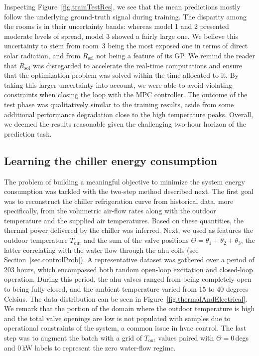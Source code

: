 Inspecting Figure~\ref{fig.trainTestRes}, we see that the mean predictions mostly follow the underlying ground-truth signal during training. The disparity among the rooms is in their uncertainty bands: whereas model 1 and 2 presented moderate levels of spread, model 3 showed a fairly large one. We believe this uncertainty to stem from room~3 being the most exposed one in terms of direct solar radiation, and from $R_\text{sol}$ not being a feature of its GP. We remind the reader that $R_\text{sol}$ was disregarded to accelerate the real-time computations and ensure that the optimization problem was solved within the time allocated to it. By taking this larger uncertainty into account, we were able to avoid violating constraints when closing the loop with the MPC controller. The outcome of the test phase was qualitatively similar to the training results, aside from some additional performance degradation close to the high temperature peaks. Overall, we deemed the results reasonable given the challenging two-hour horizon of the prediction task.

\subsection{Learning the chiller energy consumption}
\label{sec:learningChiller}

The problem of building a meaningful objective to minimize the system energy consumption was tackled with the two-step method described next. The first goal was to reconstruct the chiller refrigeration curve from historical data, more specifically, from the volumetric air-flow rates along with the outdoor temperature and the supplied air temperatures. Based on these quantities, the thermal power delivered by the chiller was inferred. Next, we used as features the outdoor temperature $T_\text{out}$ and the sum of the valve positions $\Theta = \theta_1 + \theta_2 + \theta_3$, the latter correlating with the water flow through the \ac{ahu} coils (see Section~\ref{sec.controlProb}). A representative dataset was gathered over a period of 203 hours, which encompassed both random open-loop excitation and closed-loop operation. During this period, the \ac{ahu} valves ranged from being completely open to being fully closed, and the ambient temperature varied from 15 to 40 degrees Celsius. The data distribution can be seen in Figure~\ref{fig.thermalAndElectrical}. We remark that the portion of the domain where the outdoor temperature is high and the total valve openings are low is not populated with samples due to operational constraints of the system, a common issue in \ac{hvac} control. The last step was to augment the batch with a grid of $T_\text{out}$ values paired with $\Theta=0\,$degs and $0\,$kW labels to represent the zero water-flow regime.


